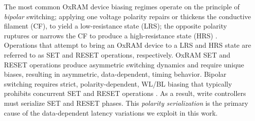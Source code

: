 The most common OxRAM device biasing regimes operate on the principle of \textit{bipolar} switching; applying one voltage polarity repairs or thickens the conductive filament (CF), to yield a low-resistance state (LRS); the opposite polarity ruptures or narrows the CF to produce a high-resistance state (HRS) \cite{wong2012metal, ielmini2025resistive}. Operations that attempt to bring an OxRAM device to a LRS and HRS state are referred to as SET and RESET operations, respectively. OxRAM SET and RESET operations produce asymmetric switching dynamics and require unique biases, resulting in asymmetric, data-dependent, timing behavior.
Bipolar switching requires strict, polarity-dependent, WL/BL biasing that typically prohibits concurrent SET and RESET operations \cite{xu2015overcoming, yu2016resistive}. As a result, write controllers must serialize SET and RESET phases.
This \emph{polarity serialization} is the primary cause of the data-dependent latency variations we exploit in this work.
